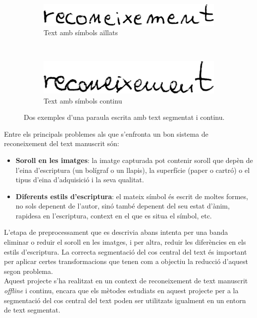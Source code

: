\begin{figure}
\centering
\begin{subfigure}[b]{0.4\textwidth}
\centering
\includegraphics[width=\textwidth]{images/reconeixement_segmentat.eps}
\caption{Text amb símbols aïllats}\label{fig:text_segmentat}
\end{subfigure}
~
\begin{subfigure}[b]{0.4\textwidth}
\centering
\includegraphics[width=\textwidth]{images/reconeixement_continu.eps}
\caption{Text amb símbols continu}\label{fig:text_continu}
\end{subfigure}
\caption{Dos exemples d'una paraula escrita amb text segmentat i continu.}
\end{figure}

Entre els principals problemes als que s'enfronta un bon sistema de reconeixement del text manuscrit són:
\begin{itemize}
\item \textbf{Soroll en les imatges}: la imatge capturada pot contenir soroll que depèn de l'eina d'escriptura (un bolígraf o un llapis), la superfície (paper o cartró) o el tipus d'eina d'adquisició i la seva qualitat.
\item \textbf{Diferents estils d'escriptura}: el mateix símbol és escrit de moltes formes, no sols depenent de l'autor, sinó també depenent del seu estat d'ànim, rapidesa en l'escriptura, context en el que es situa el símbol, etc.
\end{itemize}

L'etapa de preprocessament que es descrivia abans intenta per una banda eliminar o reduir el soroll en les imatges, i per altra, reduir les diferències en els estils d'escriptura. La correcta segmentació del cos central del text és important per aplicar certes transformacions que tenen com a objectiu la reducció d'aquest segon problema.\\

Aquest projecte s'ha realitzat en un context de reconeixement de text manuscrit \emph{offline} i continu, encara que els mètodes estudiats en aquest projecte per a la segmentació del cos central del text poden ser utilitzats igualment en un entorn de text segmentat.\\

